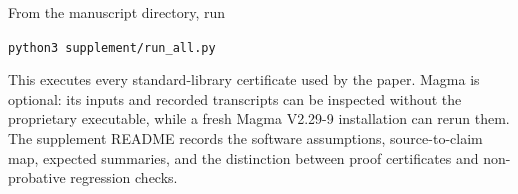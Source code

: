 From the manuscript directory, run

\begin{center}
 \texttt{python3 supplement/run\_all.py}
\end{center}

This executes every standard-library certificate used by the paper. Magma is
optional: its inputs and recorded
transcripts can be inspected without the proprietary executable, while a
fresh Magma V2.29-9 installation can rerun them. The supplement README records
the software assumptions, source-to-claim map, expected summaries, and the
distinction between proof certificates and non-probative regression checks.
